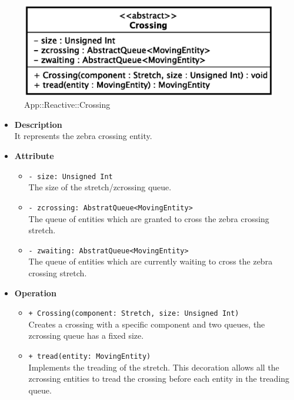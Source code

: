 \begin{figure}[h]
\centering
\includegraphics[scale=0.6,keepaspectratio]{images/solution/crossing.eps}
\caption{App::Reactive::Crossing}
\label{fig:sd-app-crossing}
\end{figure}
\FloatBarrier
\begin{itemize}
  \item \textbf{Description} \\
    It represents the zebra crossing entity. 
  \item \textbf{Attribute}
  \begin{itemize}
    \item \texttt{- size: Unsigned Int} \\
The size of the stretch/zcrossing queue.
    \item \texttt{- zcrossing: AbstratQueue<MovingEntity>} \\
The queue of entities which are granted to cross the zebra crossing stretch.
  \item \texttt{- zwaiting: AbstratQueue<MovingEntity>} \\
The queue of entities which are currently waiting to cross the zebra crossing stretch.
  \end{itemize}
\item \textbf{Operation}
  \begin{itemize}
    \item \texttt{+ Crossing(component: Stretch, size: Unsigned Int)} \\
Creates a crossing with a specific component and two queues, the zcrossing queue
has a fixed size.
    \item \texttt{+ tread(entity: MovingEntity)} \\
Implements the treading of the stretch. This decoration allows all the zcrossing entities 
to tread the crossing before each entity in the treading queue. 
  \end{itemize}
\end{itemize}
